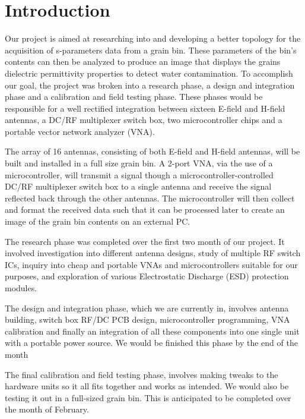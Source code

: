 
\chapter[Introduction]{Introduction}
\label{sec:intro}


Our project is aimed at researching into and developing a better topology for the acquisition of s-parameters data from a grain bin. These parameters of the bin’s contents can then be analyzed to produce an image that displays the grains dielectric permittivity properties to detect water contamination. To accomplish our goal, the project was broken into a research phase, a design and integration phase and a calibration and field testing phase. These phases would be responsible for a well rectified integration between sixteen E-field and H-field antennas, a DC/RF multiplexer switch box, two microcontroller chips and a portable vector network analyzer (VNA).

The array of 16 antennas, consisting of both E-field and H-field antennas, will be built and installed in a full size grain bin. A 2-port VNA, via the use of a microcontroller, will transmit a signal though a microcontroller-controlled DC/RF multiplexer switch box to a single antenna and receive the signal reflected back through the other antennas. The microcontroller will then collect and format the received data such that it can be processed later to create an image of the grain bin contents on an external PC.

The research phase was completed over the first two month of our project. It involved investigation into different antenna designs, study of multiple RF switch ICs, inquiry into cheap and portable VNAs and microcontrollers suitable for our purposes, and exploration of various Electrostatic Discharge (ESD) protection modules. 

The design and integration phase, which we are currently in, involves antenna building, switch box RF/DC PCB design, microcontroller programming, VNA calibration and finally an integration of all these components into one single unit with a portable power source. We would be finished this phase by the end of the month

The final calibration and field testing phase, involves making tweaks to the hardware units so it all fits together and works as intended. We would also be testing it out in a full-sized grain bin. This is anticipated to be completed over the month of February. 





